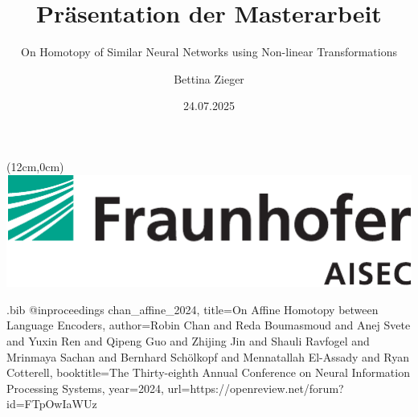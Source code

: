 \documentclass[aspectratio=169,16pt]{beamer}
\begin{document}
\renewcommand\lstlistingname{Code}

\lstset{style=mystyle}

\title{Präsentation der Masterarbeit}
\subtitle{On Homotopy of Similar Neural Networks using Non-linear Transformations}
\author{Bettina Zieger}

\begin{textblock*}{5cm}(12cm,0cm)  %
	\includegraphics[width=0.7\linewidth]{BilderPräsentation/aisec_logo.pdf}
\end{textblock*}
	


\date{24.07.2025}

\begin{filecontents}{\jobname.bib}
@inproceedings{
chan_affine_2024,
title={On Affine Homotopy between Language Encoders},
author={Robin Chan and Reda Boumasmoud and Anej Svete and Yuxin Ren and Qipeng Guo and Zhijing Jin and Shauli Ravfogel and Mrinmaya Sachan and Bernhard Sch{\"o}lkopf and Mennatallah El-Assady and Ryan Cotterell},
booktitle={The Thirty-eighth Annual Conference on Neural Information Processing Systems},
year={2024},
url={https://openreview.net/forum?id=FTpOwIaWUz}
}

\end{filecontents}



\maketitle
{}
\end{document}
